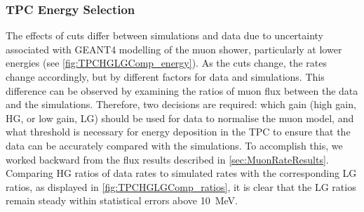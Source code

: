 \subsubsection{TPC Energy Selection}
The effects of cuts differ between simulations and data due to uncertainty associated with GEANT4 modelling of the muon shower, particularly at lower energies (see \autoref{fig:TPCHGLGComp_energy}). As the cuts change, the rates change accordingly, but by different factors for data and simulations. This difference can be observed by examining the ratios of muon flux between the data and the simulations. Therefore, two decisions are required: which gain (high gain, HG, or low gain, LG) should be used for data to normalise the muon model, and what threshold is necessary for energy deposition in the TPC to ensure that the data can be accurately compared with the simulations. To accomplish this, we worked backward from the flux results described in \autoref{sec:MuonRateResults}. Comparing HG ratios of data rates to simulated rates with the corresponding LG ratios, as displayed in \autoref{fig:TPCHGLGComp_ratios}, it is clear that the LG ratios remain steady within statistical errors above 10~MeV. 
